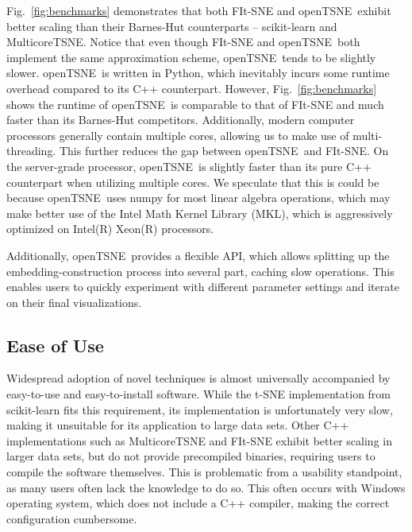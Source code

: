 \documentclass[twocolumn]{bmcart}
\newcommand{\opentsne}{\textsf{openTSNE}}
\begin{document}
Fig.~\ref{fig:benchmarks} demonstrates that both \textsf{FIt-SNE} and
\opentsne\ exhibit better scaling than their Barnes-Hut
counterparts -- \textsf{scikit-learn} and \textsf{MulticoreTSNE}. Notice that
even though \textsf{FIt-SNE} and \opentsne\ both implement the same
approximation scheme, \opentsne\ tends to be slightly slower. \opentsne\ is
written in Python, which inevitably incurs some runtime overhead compared to
its C++ counterpart. However, Fig.~\ref{fig:benchmarks} shows the
runtime of \opentsne\ is comparable to that of \textsf{FIt-SNE} and much faster
than its Barnes-Hut competitors. Additionally, modern computer processors
generally contain multiple cores, allowing us to make use of multi-threading.
This further reduces the gap between \opentsne\ and \textsf{FIt-SNE}. On the
server-grade processor, \opentsne\ is slightly faster than its pure C++
counterpart when utilizing multiple cores. We speculate that this is could be because \opentsne\ uses
\textsf{numpy} for most linear algebra operations, which may make better use of
the Intel Math Kernel Library (MKL), which is aggressively optimized on
Intel(R) Xeon(R) processors.

Additionally, \opentsne\ provides a flexible API, which allows splitting up the
embedding-construction process into several part, caching slow operations. This
enables users to quickly experiment with different parameter settings and
iterate on their final visualizations.

\subsection*{Ease of Use}

Widespread adoption of novel techniques is almost universally accompanied by
easy-to-use and easy-to-install software. While the t-SNE implementation from
\textsf{scikit-learn} fits this requirement, its implementation is
unfortunately very slow, making it unsuitable for its application to large data
sets. Other C++ implementations such as \textsf{MulticoreTSNE} and
\textsf{FIt-SNE} exhibit better scaling in larger data sets, but do not provide
precompiled binaries, requiring users to compile the software themselves. This
is problematic from a usability standpoint, as many users often lack the
knowledge to do so. This often occurs with Windows operating system, which does
not include a C++ compiler, making the correct configuration cumbersome.
\end{document}
